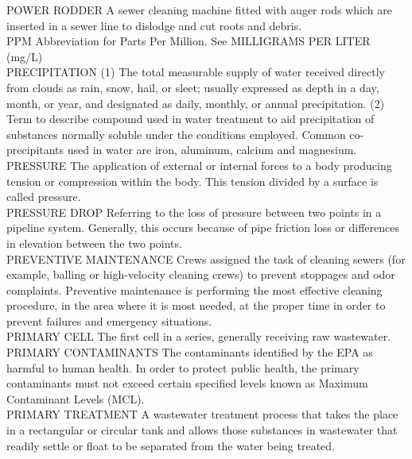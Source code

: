 POWER RODDER
A sewer cleaning machine fitted with auger rods which are inserted in a sewer line to dislodge and cut roots and debris. 
\vspace{0.3cm}\\
PPM
Abbreviation for Parts Per Million. See MILLIGRAMS PER LITER (mg/L)
\vspace{0.3cm}\\
PRECIPITATION
(1) The total measurable supply of water received directly from clouds as rain, snow, hail, or sleet; usually expressed as depth in a day, month, or year, and designated as daily, monthly, or annual precipitation. (2) Term to describe compound used in water treatment to aid precipitation of substances normally soluble under the conditions employed. Common co-precipitants used in water are iron, aluminum, calcium and magnesium.
\vspace{0.3cm}\\
PRESSURE
The application of external or internal forces to a body producing tension or compression within the body. This tension divided by a surface is called pressure.
\vspace{0.3cm}\\
PRESSURE DROP
Referring to the loss of pressure between two points in a pipeline system. Generally, this occurs because of pipe friction loss or differences in elevation between the two points.
\vspace{0.3cm}\\
PREVENTIVE MAINTENANCE
Crews assigned the task of cleaning sewers (for example, balling or high-velocity cleaning crews) to prevent stoppages and odor complaints. Preventive maintenance is performing the most effective cleaning procedure, in the area where it is most needed, at the proper time in order to prevent failures and emergency situations. 
\vspace{0.3cm}\\
PRIMARY CELL
The first cell in a series, generally receiving raw wastewater.
\vspace{0.3cm}\\
PRIMARY CONTAMINANTS
The contaminants identified by the EPA as harmful to human health. In order to protect public health, the primary contaminants must not exceed certain specified levels known as Maximum Contaminant Levels (MCL). 
\vspace{0.3cm}\\
PRIMARY TREATMENT
A wastewater treatment process that takes the place in a rectangular or circular tank and allows those substances in wastewater that readily settle or float to be separated from the water being treated.
